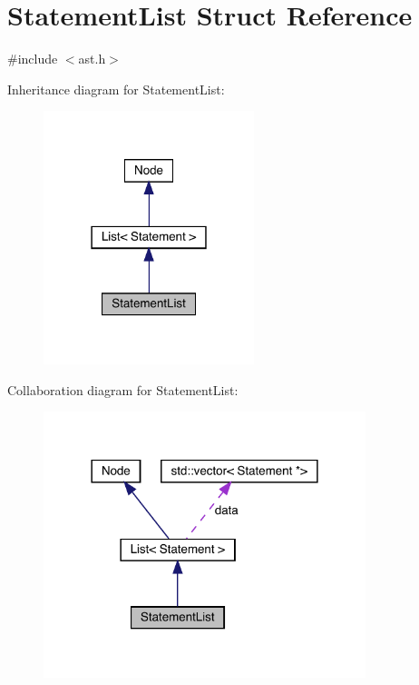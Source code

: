 \hypertarget{struct_statement_list}{}\section{Statement\+List Struct Reference}
\label{struct_statement_list}


{\ttfamily \#include $<$ast.\+h$>$}



Inheritance diagram for Statement\+List\+:
\nopagebreak
\begin{figure}[H]
\begin{center}
\leavevmode
\includegraphics[width=174pt]{struct_statement_list__inherit__graph}
\end{center}
\end{figure}


Collaboration diagram for Statement\+List\+:
\nopagebreak
\begin{figure}[H]
\begin{center}
\leavevmode
\includegraphics[width=266pt]{struct_statement_list__coll__graph}
\end{center}
\end{figure}
